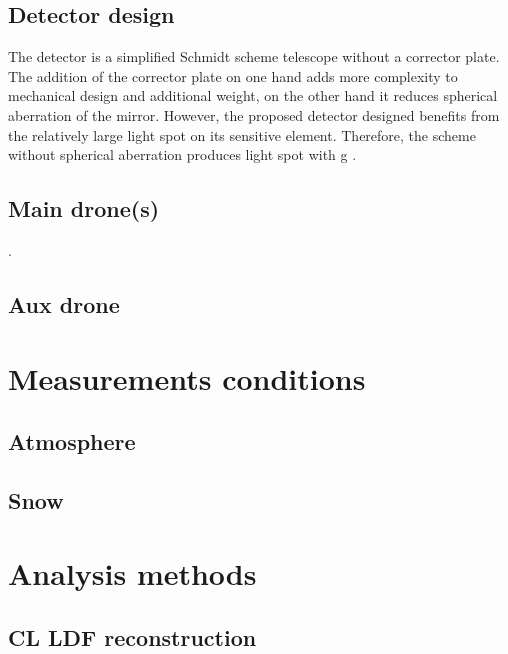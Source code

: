 \documentclass[a4paper,11pt]{article}
\begin{document}
\subsection{Detector design}
The detector is a simplified Schmidt scheme telescope without a corrector plate. The addition of the corrector plate on one hand adds more complexity to mechanical design and additional weight, on the other hand it reduces spherical aberration of the mirror. However, the proposed detector designed benefits from the relatively large light spot on its sensitive element. Therefore, the scheme without 
spherical aberration produces light spot with g
.
\subsection{Main drone(s)}
.
\subsection{Aux drone}

\section{Measurements conditions}
\subsection{Atmosphere}
\subsection{Snow}

\section{Analysis methods}
\subsection{CL LDF reconstruction}
\end{document}
